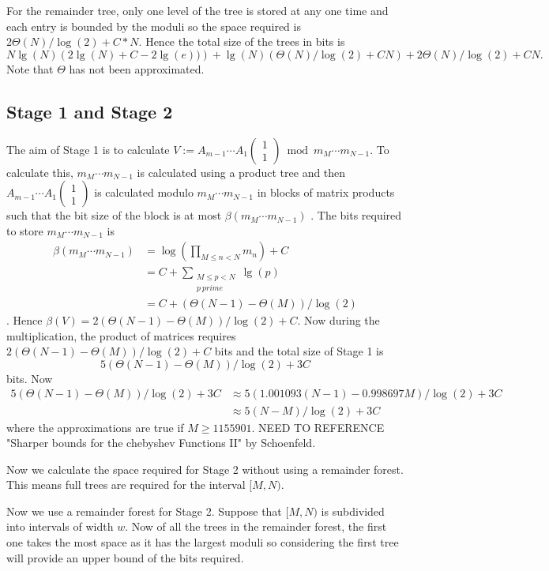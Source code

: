 \documentclass[10pt]{article}
\begin{document}
For the remainder tree, only one level of the tree is stored at any one time and each entry is bounded by the moduli so the space required is $2\Theta(N)/\log(2)+C*N$. Hence the total size of the trees in bits is \[N\lg(N)\left(2\lg(N)+C-2\lg(e))\right)+\lg(N)\left(\Theta(N)/\log(2)+CN\right)+2\Theta(N)/\log(2)+CN.\]
Note that $\Theta$ has not been approximated.  

\subsection{Stage 1 and Stage 2}   

The aim of Stage 1 is to calculate $V:=A_{m-1}\cdots A_{1} \begin{pmatrix} 1\\1\end{pmatrix} \bmod {m_{M}\cdots m_{N-1}}$. To calculate this, $m_{M}\cdots m_{N-1}$ is calculated using a product tree and then $A_{m-1}\cdots A_{1} \begin{pmatrix} 1\\1\end{pmatrix}$ is calculated modulo $m_{M}\cdots m_{N-1}$ in blocks of matrix products such that the bit size of the block is at most $\beta(m_{M}\cdots m_{N-1})$ . The bits required to store  $m_{M}\cdots m_{N-1}$ is \begin{align*}
\beta(m_{M}\cdots m_{N-1}) &=\log(\prod_{M\leq n< N} m_n)+C\\
&=C+\sum_{\substack{M\leq p<N\\p \ prime}}\lg(p)\\ &=C+(\Theta(N-1)-\Theta(M))/\log(2) \end{align*}. Hence $\beta(V)=2(\Theta(N-1)-\Theta(M))/\log(2)+C$. Now during the multiplication, the product of matrices requires  $2(\Theta(N-1)-\Theta(M))/\log(2)+C$ bits and the total size of Stage 1 is \[5(\Theta(N-1)-\Theta(M))/\log(2)+3C\] bits. Now \begin{align*} 5(\Theta(N-1)-\Theta(M))/\log(2)+3C&\approx 5(1.001093(N-1)-0.998697M)/\log(2)+3C \\ &\approx 5(N-M)/\log(2)+3C \end{align*}
where the approximations are true if $M\geq1155901$. NEED TO REFERENCE "Sharper bounds for the chebyshev Functions II" by Schoenfeld.

Now we calculate the space required for Stage 2 without using a remainder forest. This means full trees are required for the interval $[M,N)$. 

Now we use a remainder forest for Stage 2. Suppose that $[M,N)$ is subdivided into intervals of width $w$. Now of all the trees in the remainder forest, the first one takes the most space as it has the largest moduli so considering the first tree will provide an upper bound of the bits required.
\end{document}
